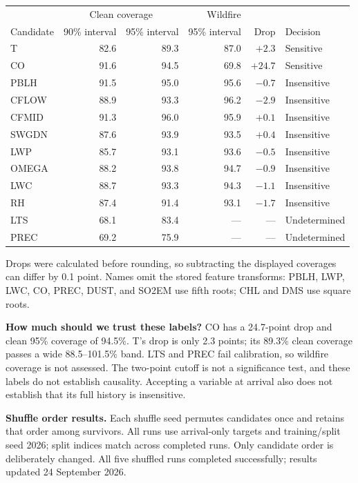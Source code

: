 \documentclass[11pt]{article}
\begin{document}
\begin{center}
\small
\begin{tabular}{lrrrrl}
\toprule
 & \multicolumn{2}{c}{Clean coverage} & Wildfire & & \\
Candidate & 90\% interval & 95\% interval & 95\% interval & Drop & Decision \\
\midrule
T     & 82.6 & 89.3 & 87.0 & $+2.3$ & Sensitive \\
CO    & 91.6 & 94.5 & 69.8 & $+24.7$ & Sensitive \\
\midrule
PBLH  & 91.5 & 95.0 & 95.6 & $-0.7$ & Insensitive \\
CFLOW & 88.9 & 93.3 & 96.2 & $-2.9$ & Insensitive \\
CFMID & 91.3 & 96.0 & 95.9 & $+0.1$ & Insensitive \\
SWGDN & 87.6 & 93.9 & 93.5 & $+0.4$ & Insensitive \\
LWP   & 85.7 & 93.1 & 93.6 & $-0.5$ & Insensitive \\
OMEGA & 88.2 & 93.8 & 94.7 & $-0.9$ & Insensitive \\
LWC   & 88.7 & 93.3 & 94.3 & $-1.1$ & Insensitive \\
RH    & 87.4 & 91.4 & 93.1 & $-1.7$ & Insensitive \\
\midrule
LTS   & 68.1 & 83.4 & --- & --- & Undetermined \\
PREC  & 69.2 & 75.9 & --- & --- & Undetermined \\
\bottomrule
\end{tabular}
\end{center}

\smallskip
Drops were calculated before rounding, so subtracting the displayed coverages
can differ by 0.1 point. Names omit the stored feature transforms: PBLH, LWP,
LWC, CO, PREC, DUST, and SO2EM use fifth roots; CHL and DMS use square roots.

\textbf{How much should we trust these labels?}
CO has a 24.7-point drop and clean 95\% coverage of 94.5\%. T's drop is only 2.3
points; its 89.3\% clean coverage passes a wide 88.5--101.5\% band. LTS and PREC
fail calibration, so wildfire coverage is not assessed. The two-point cutoff is
not a significance test, and these labels do not establish causality. Accepting
a variable at arrival also does not establish that its full history is insensitive.

\textbf{Shuffle order results.}
Each shuffle seed permutes candidates once and retains that order among survivors.
All runs use arrival-only targets and training/split seed 2026; split indices match
across completed runs. Only candidate order is deliberately changed.
All five shuffled runs completed successfully; results updated 24 September 2026.
\end{document}
